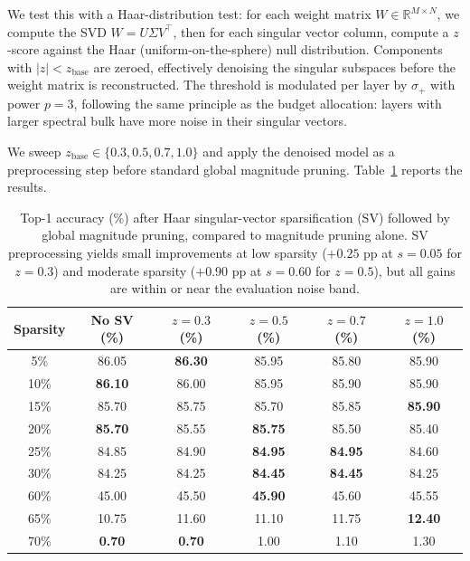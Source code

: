 \documentclass[11pt]{article}
\theoremstyle{plain}
\theoremstyle{definition}
\theoremstyle{remark}
\newcommand{\1}{\mathbf{1}}
\begin{document}
We test this with a Haar-distribution test: for each weight matrix \(W \in \mathbb{R}^{M \times N}\), we compute the SVD \(W = U \Sigma V^\top\), then for each singular vector column, compute a \(z\)-score against the Haar (uniform-on-the-sphere) null distribution.  Components with \(|z| < z_{\mathrm{base}}\) are zeroed, effectively denoising the singular subspaces before the weight matrix is reconstructed.  The threshold is modulated per layer by \(\sigma_+\) with power \(p=3\), following the same principle as the budget allocation: layers with larger spectral bulk have more noise in their singular vectors.

We sweep \(z_{\mathrm{base}} \in \{0.3, 0.5, 0.7, 1.0\}\) and apply the denoised model as a preprocessing step before standard global magnitude pruning.  Table~\ref{tab:sv_preprocessing} reports the results.

\begin{table}[ht]
\centering
\caption{Top-1 accuracy (\%) after Haar singular-vector sparsification (SV) followed by global magnitude pruning, compared to magnitude pruning alone.  SV preprocessing yields small improvements at low sparsity (\(+0.25\) pp at \(s=0.05\) for \(z=0.3\)) and moderate sparsity (\(+0.90\) pp at \(s=0.60\) for \(z=0.5\)), but all gains are within or near the evaluation noise band.}
\label{tab:sv_preprocessing}
\begin{tabular}{cccccc}
\toprule
Sparsity & No SV (\%) & \(z=0.3\) (\%) & \(z=0.5\) (\%) & \(z=0.7\) (\%) & \(z=1.0\) (\%) \\
\midrule
5\%  & 86.05 & \textbf{86.30} & 85.95 & 85.80 & 85.90 \\
10\% & \textbf{86.10} & 86.00 & 85.95 & 85.90 & 85.90 \\
15\% & 85.70 & 85.75 & 85.70 & 85.85 & \textbf{85.90} \\
20\% & \textbf{85.70} & 85.55 & \textbf{85.75} & 85.50 & 85.40 \\
25\% & 84.85 & 84.90 & \textbf{84.95} & \textbf{84.95} & 84.60 \\
30\% & 84.25 & 84.25 & \textbf{84.45} & \textbf{84.45} & 84.25 \\
\midrule
60\% & 45.00 & 45.50 & \textbf{45.90} & 45.60 & 45.55 \\
65\% & 10.75 & 11.60 & 11.10 & 11.75 & \textbf{12.40} \\
70\% & \textbf{0.70} & \textbf{0.70} & 1.00 & 1.10 & 1.30 \\
\bottomrule
\end{tabular}
\end{table}
\end{document}

